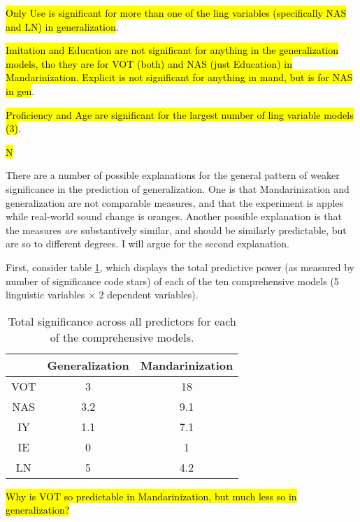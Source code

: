 \hl{Only Use is significant for more than one of the ling variables (specifically NAS and LN) in generalization}.

\hl{Imitation and Education are not significant for anything in the generalization models, tho they are for VOT (both) and NAS (just Education) in Mandarinization. Explicit is not significant for anything in mand, but is for NAS in gen}.

\hl{Proficiency and Age are significant for the largest number of ling variable models (3)}.

\hl{N}

There are a number of possible explanations for the general pattern of weaker significance in the prediction of generalization. One is that Mandarinization and generalization are not comparable measures, and that the experiment is apples while real-world sound change is oranges. Another possible explanation is that the measures \emph{are} substantively similar, and should be similarly predictable, but are so to different degrees. I will argue for the second explanation.

First, consider table \ref{tab:totalSigDependentByLing}, which displays the total predictive power (as measured by number of significance code stars) of each of the ten comprehensive models (5 linguistic variables $\times$ 2 dependent variables).

\begin{table}[]
    \centering
    \begin{tabular}{|c|c|c|}
        \hline
         & \textbf{Generalization} & \textbf{Mandarinization}\\
        \hline
        VOT & 3 & 18\\
        \hline
        NAS & 3.2 & 9.1\\
        \hline
        IY & 1.1 & 7.1\\
        \hline
        IE & 0 & 1\\
        \hline
        LN & 5 & 4.2\\
        \hline
    \end{tabular}
    \caption{Total significance across all predictors for each of the comprehensive models.}
    \label{tab:totalSigDependentByLing}
\end{table}

\hl{Why is VOT so predictable in Mandarinization, but much less so in generalization?}

